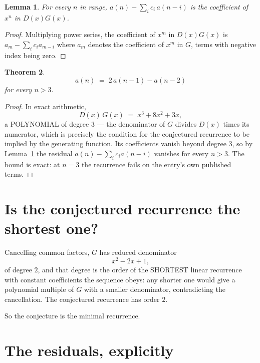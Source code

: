 \documentclass[11pt,a4paper]{article}
\theoremstyle{plain}
\newtheorem{theorem}{Theorem}
\newtheorem{lemma}[theorem]{Lemma}
\theoremstyle{definition}
\begin{document}
\begin{lemma}\label{lem:key}
For every $n$ in range, $a(n)-\sum_i c_i\,a(n-i)$ is the coefficient of $x^{n}$ in
$D(x)G(x)$.
\end{lemma}

\begin{proof}
Multiplying power series, the coefficient of $x^{m}$ in $D(x)G(x)$ is
$a_m-\sum_i c_i a_{m-i}$ where $a_m$ denotes the coefficient of $x^{m}$ in $G$, terms with
negative index being zero.
\end{proof}

\begin{theorem}
\[
a(n)\;=\;2\,a(n-1) - a(n-2)
\]
for every $n>3$.
\end{theorem}

\begin{proof}
In exact arithmetic,
\[
D(x)\,G(x)\;=\;x^{3} + 8 x^{2} + 3 x,
\]
a POLYNOMIAL of degree $3$ --- the denominator of $G$ divides $D(x)$ times its numerator,
which is precisely the condition for the conjectured recurrence to be implied by the
generating function. Its coefficients vanish beyond degree $3$, so by
Lemma~\ref{lem:key} the residual $a(n)-\sum_ic_ia(n-i)$ vanishes for every
$n>3$. The bound is exact: at $n=3$ the recurrence fails on the entry's own published terms.
\end{proof}

\section{Is the conjectured recurrence the shortest one?}

Cancelling common factors, $G$ has reduced denominator
\[
x^{2} - 2 x + 1,
\]
of degree $2$, and that degree is the order of the SHORTEST linear recurrence with
constant coefficients the sequence obeys: any shorter one would give a polynomial multiple of
$G$ with a smaller denominator, contradicting the cancellation. The conjectured recurrence has
order $2$.

So the conjecture is the minimal recurrence.

\section{The residuals, explicitly}
\end{document}
